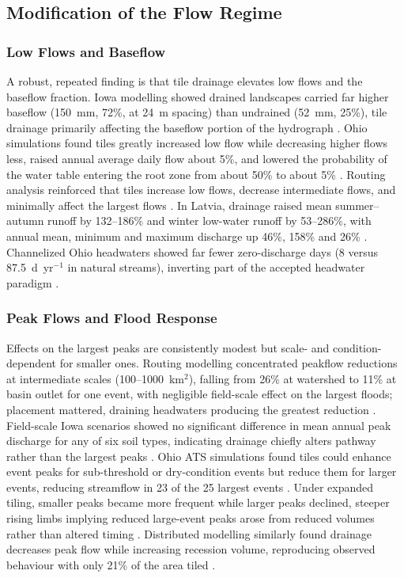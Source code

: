 \documentclass[11pt]{article}
\begin{document}
\subsection{Modification of the Flow Regime}

\subsubsection{Low Flows and Baseflow}

A robust, repeated finding is that tile drainage elevates low flows and the baseflow fraction. Iowa modelling showed drained landscapes carried far higher baseflow (150~mm, 72\%, at 24~m spacing) than undrained (52~mm, 25\%), tile drainage primarily affecting the baseflow portion of the hydrograph \parencite{Schilling2008}. Ohio simulations found tiles greatly increased low flow while decreasing higher flows less, raised annual average daily flow about 5\%, and lowered the probability of the water table entering the root zone from about 50\% to about 5\% \parencite{Rathore2025}. Routing analysis reinforced that tiles increase low flows, decrease intermediate flows, and minimally affect the largest flows \parencite{Sloan2017}. In Latvia, drainage raised mean summer--autumn runoff by 132--186\% and winter low-water runoff by 53--286\%, with annual mean, minimum and maximum discharge up 46\%, 158\% and 26\% \parencite{Apsite2017}. Channelized Ohio headwaters showed far fewer zero-discharge days (8 versus 87.5~d~yr$^{-1}$ in natural streams), inverting part of the accepted headwater paradigm \parencite{King2009}.

\subsubsection{Peak Flows and Flood Response}

Effects on the largest peaks are consistently modest but scale- and condition-dependent for smaller ones. Routing modelling concentrated peakflow reductions at intermediate scales (100--1000~km$^2$), falling from 26\% at watershed to 11\% at basin outlet for one event, with negligible field-scale effect on the largest floods; placement mattered, draining headwaters producing the greatest reduction \parencite{Sloan2017}. Field-scale Iowa scenarios showed no significant difference in mean annual peak discharge for any of six soil types, indicating drainage chiefly alters pathway rather than the largest peaks \parencite{Sloan2016}. Ohio ATS simulations found tiles could enhance event peaks for sub-threshold or dry-condition events but reduce them for larger events, reducing streamflow in 23 of the 25 largest events \parencite{Rathore2025}. Under expanded tiling, smaller peaks became more frequent while larger peaks declined, steeper rising limbs implying reduced large-event peaks arose from reduced volumes rather than altered timing \parencite{Rahman2014}. Distributed modelling similarly found drainage decreases peak flow while increasing recession volume, reproducing observed behaviour with only 21\% of the area tiled \parencite{Fonley2021}.
\end{document}
